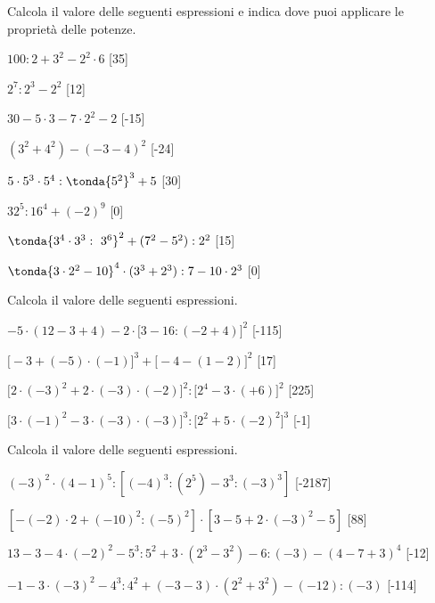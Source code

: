 \begin{esercizio} %
Calcola il valore delle seguenti espressioni e indica dove puoi applicare le 
proprietà delle potenze.
\begin{multicols}{2}
\begin{enumeratea}
 \item \(100:2+3^2 -2^2\cdot 6\) \hfill[35]
 \item \(2^7:2^3 -2^2\) \hfill[12]
 \item \(30-5\cdot 3 -7\cdot 2^2 -2\) \hfill[-15]
 \item \((3^2 +4^2) -(-3-4)^2\) \hfill[-24]
 \item \(5\cdot 5^3\cdot 5^4: \tonda{5^2 }^3 +5\) \hfill[30]
 \item \(32^5:16^4 +(-2)^9\) \hfill[0]
 \item \(\tonda{3^4\cdot 3^3:~3^6 }^2 +(7^2-5^2):2^2\) \hfill[15]
 \item \(\tonda{3\cdot 2^2 -10 }^4\cdot (3^3+2^3):7-10\cdot 2^3\) \hfill[0]
\end{enumeratea}
\end{multicols}
\end{esercizio}

\begin{esercizio} %
Calcola il valore delle seguenti espressioni.
 \begin{enumeratea}
 \item \(-5\cdot(12-3+4)-2\cdot\big[3-16:(-2+4)\big]^2\) \hfill[-115]
 \item \(\big[-3+(-5)\cdot(-1)\big]^3+\big[-4-(1-2)\big]^2\) \hfill[17]
 \item 
\(\big[2\cdot(-3)^2+2\cdot(-3)\cdot(-2)\big]^2:\big[2^4-3\cdot(+6)\big]^2\)
 \hfill[225]
 \item 
\(\big[3\cdot(-1)^2-3\cdot(-3)\cdot(-3)\big]^3:\big[2^2+5\cdot(-2)^2\big]^3\)
 \hfill[-1]
 \end{enumeratea}
\end{esercizio}

\begin{esercizio} %
Calcola il valore delle seguenti espressioni.
 \begin{enumeratea}
 \item \((-3)^2\cdot(4-1)^5:[(-4)^3:(2^5)-3^3:(-3)^3]\) \hfill[-2187]
 \item \([-(-2)\cdot2+(-10)^2:(-5)^2]\cdot[3-5+2\cdot(-3)^2-5]\) \hfill[88]
 \item \(13-3-4\cdot(-2)^2-5^3:5^2+3\cdot(2^3-3^2)-6:(-3)-(4-7+3)^4\)
  \hfill[-12]
 \item \(-1-3\cdot(-3)^2-4^3:4^2+(-3-3)\cdot(2^2+3^2)-(-12):(-3)\) 
\hfill[-114]
 \end{enumeratea}
\end{esercizio}

